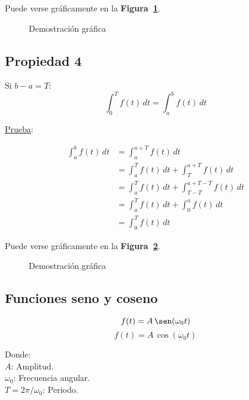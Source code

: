 Puede verse gráficamente en la \textbf{Figura~\ref{figura_04}}.
\begin{figure}[H]
    \centering
    
    \caption{Demostración gráfica}\label{figura_04}
\end{figure}

\subsection*{Propiedad 4}
Si $b-a=T$:
\begin{equation}
    \int_{0}^{T} f(t)\,dt=\int_{a}^{b} f(t)\,dt
\label{propiedad4}
\end{equation}

\underline{Prueba}:

\begin{equation*}
\begin{split}
    \int_{a}^{b} f(t)\,dt
        &=\int_{a}^{a+T} f(t)\,dt\\
        &=\int_{a}^{T} f(t)\,dt+\int_{T}^{a+T} f(t)\,dt\\
        &=\int_{a}^{T} f(t)\,dt+\int_{T-T}^{a+T-T} f(t)\,dt\\
        &=\int_{a}^{T} f(t)\,dt+\int_{0}^{a} f(t)\,dt\\
        &=\int_{0}^{T} f(t)\,dt
\end{split}
\end{equation*}

Puede verse gráficamente en la \textbf{Figura~\ref{figura_05}}.
\begin{figure}[H]
    \centering
    
    \caption{Demostración gráfica}\label{figura_05}
\end{figure}

\subsection{Funciones seno y coseno}
\begin{equation*}
    f(t)=A\,\sen(\omega_0 t)
\end{equation*}
\begin{equation*}
    f(t)=A\,\cos(\omega_0 t)
\end{equation*}

Donde:\\
\indent\indent$A$: Amplitud.\\
\indent\indent$\omega_0$: Frecuencia angular.\\
\indent\indent$T=2\pi/\omega_0$: Periodo.\\

